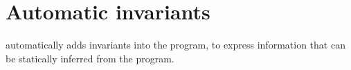 

\section{Automatic invariants}

\caduceus{} automatically adds invariants into the program, to express
information that can be statically inferred from the program. 

